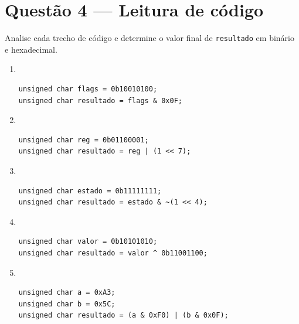 \documentclass[12pt,a4paper]{article}
\newif\ifmostrarrespostas
\begin{document}
\section{Questão 4 --- Leitura de código}

Analise cada trecho de código e determine o valor final de \texttt{resultado} em binário e hexadecimal.

\begin{enumerate}[label=\alph*)]
\item ~\vspace{-6pt}
\begin{lstlisting}[style=code]
unsigned char flags = 0b10010100;
unsigned char resultado = flags & 0x0F;
\end{lstlisting}

\item ~\vspace{-6pt}
\begin{lstlisting}[style=code]
unsigned char reg = 0b01100001;
unsigned char resultado = reg | (1 << 7);
\end{lstlisting}

\item ~\vspace{-6pt}
\begin{lstlisting}[style=code]
unsigned char estado = 0b11111111;
unsigned char resultado = estado & ~(1 << 4);
\end{lstlisting}

\item ~\vspace{-6pt}
\begin{lstlisting}[style=code]
unsigned char valor = 0b10101010;
unsigned char resultado = valor ^ 0b11001100;
\end{lstlisting}

\item ~\vspace{-6pt}
\begin{lstlisting}[style=code]
unsigned char a = 0xA3;
unsigned char b = 0x5C;
unsigned char resultado = (a & 0xF0) | (b & 0x0F);
\end{lstlisting}

\end{enumerate}

\ifmostrarrespostas
\begin{tcolorbox}[colback=red!5, colframe=red!40, title=\textbf{Resposta --- Questão 4}, fonttitle=\small]
\small
\begin{enumerate}[label=\alph*)]
  \item \texttt{0b00000100} = \texttt{0x04}
  \item \texttt{0b11100001} = \texttt{0xE1}
  \item \texttt{0b11101111} = \texttt{0xEF}
  \item \texttt{0b01100110} = \texttt{0x66}
  \item \texttt{0b10101100} = \texttt{0xAC}
\end{enumerate}
\end{tcolorbox}
\fi
\end{document}
